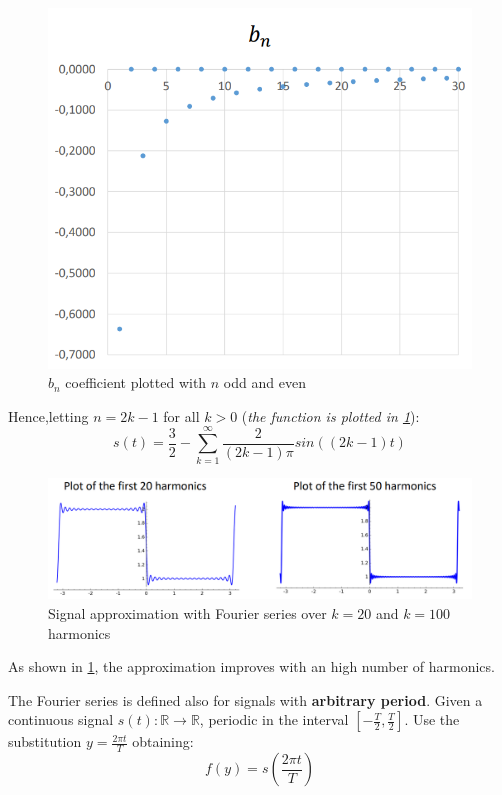 \documentclass[10pt,a4paper]{report}
\theoremstyle{definition}
\begin{document}
\begin{figure}[h!]
	\centering\includegraphics[scale=0.40]{images/Pasted image 20230507181924.png}
	\caption{$b_{n}$ coefficient plotted with $n$ odd and even}
\end{figure}


Hence,letting $n=2k-1$ for all $k > 0$ (\textit{the function is plotted in \ref{harmonic-approx}}):
\begin{equation}
s(t) = \frac{3}{2}-\sum_{k=1}^{\infty}\frac{2}{(2k-1)\pi}sin((2k-1)t)
\end{equation}

\begin{figure}[h!]
	\centering\includegraphics[scale=0.40]{images/Pasted image 20230507182103.png}
	\caption{Signal approximation with Fourier series over $k=20$ and $k=100$ harmonics}
	\label{harmonic-approx}
\end{figure}

As shown in \ref{harmonic-approx}, the approximation improves with an high number of harmonics.


The Fourier series is defined also for signals with \textbf{arbitrary period}. Given a continuous signal $s(t): \mathbb{R} \rightarrow \mathbb{R}$, periodic in the interval $[-\frac{T}{2}, \frac{T}{2}]$.
Use the substitution $y = \frac{2\pi t}{T}$ obtaining:
\begin{equation}
	f(y) = s(\frac{2\pi t}{T})
\end{equation}
\end{document}

